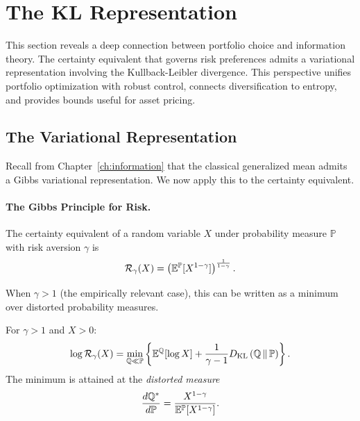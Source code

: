 
\section{The KL Representation}
\label{sec:kl-representation}

This section reveals a deep connection between portfolio choice and information theory. The certainty equivalent that governs risk preferences admits a variational representation involving the Kullback-Leibler divergence. This perspective unifies portfolio optimization with robust control, connects diversification to entropy, and provides bounds useful for asset pricing.

\subsection{The Variational Representation}
\label{subsec:variational}

Recall from Chapter~\ref{ch:information} that the classical generalized mean admits a Gibbs variational representation. We now apply this to the certainty equivalent.

\paragraph{The Gibbs Principle for Risk.}

The certainty equivalent of a random variable $X$ under probability measure $\mathbb{P}$ with risk aversion $\gamma$ is
\begin{equation}
\mathcal{R}_{\gamma}(X) = \left( \mathbb{E}^{\mathbb{P}}[X^{1-\gamma}] \right)^{\frac{1}{1-\gamma}}.
\label{eq:ce-definition}
\end{equation}

When $\gamma > 1$ (the empirically relevant case), this can be written as a minimum over distorted probability measures.

\begin{proposition}
\label{prop:variational-ce}
For $\gamma > 1$ and $X > 0$:
\begin{equation}
\log \mathcal{R}_{\gamma}(X) = \min_{\mathbb{Q} \ll \mathbb{P}} \left\{ \mathbb{E}^{\mathbb{Q}}[\log X] + \frac{1}{\gamma - 1} D_{\mathrm{KL}}\left(\mathbb{Q} \,\|\, \mathbb{P}\right) \right\}.
\label{eq:variational-ce}
\end{equation}
The minimum is attained at the \emph{distorted measure}
\begin{equation}
\frac{d\mathbb{Q}^*}{d\mathbb{P}} = \frac{X^{1-\gamma}}{\mathbb{E}^{\mathbb{P}}[X^{1-\gamma}]}.
\label{eq:distorted-measure}
\end{equation}
\end{proposition}

